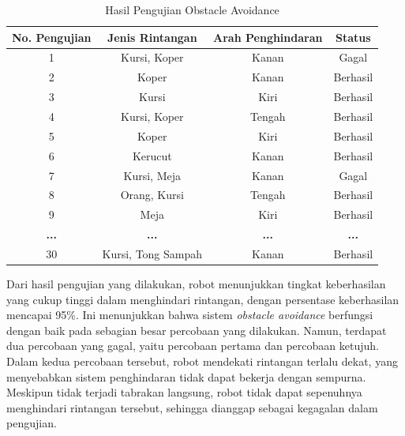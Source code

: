\begin{table}[H]
	\centering
	\caption{Hasil Pengujian Obstacle Avoidance}
	\begin{tabular}{|c|c|c|c|}
		\hline
		\textbf{No. Pengujian} & \textbf{Jenis Rintangan} & \textbf{Arah Penghindaran} & \textbf{Status} \\
		\hline
		1                      & Kursi, Koper             & Kanan                      & Gagal           \\
		\hline
		2                      & Koper                      & Kanan                      & Berhasil        \\
		\hline
		3                      & Kursi                    & Kiri                       & Berhasil        \\
		\hline
		4                      & Kursi, Koper             & Tengah                     & Berhasil        \\
		\hline
		5                      & Koper                      & Kiri                       & Berhasil        \\
		\hline
		6                      & Kerucut                  & Kanan                      & Berhasil        \\
		\hline
		7                      & Kursi, Meja              & Kanan                      & Gagal           \\
		\hline
		8                      & Orang, Kursi             & Tengah                     & Berhasil        \\
		\hline
		9                      & Meja                     & Kiri                       & Berhasil        \\
		\hline
		\textbf{...}           & \textbf{...}             & \textbf{...}               & \textbf{...}    \\
		\hline
		30                     & Kursi, Tong Sampah       & Kanan                      & Berhasil        \\
		\hline
	\end{tabular}
	\label{tab:hasil_obstacle_avoidance}
\end{table}

Dari hasil pengujian yang dilakukan, robot menunjukkan tingkat keberhasilan yang
cukup tinggi dalam menghindari rintangan, dengan persentase keberhasilan mencapai
95\%. Ini menunjukkan bahwa sistem \emph{obstacle avoidance} berfungsi dengan
baik pada sebagian besar percobaan yang dilakukan. Namun, terdapat dua percobaan
yang gagal, yaitu percobaan pertama dan percobaan ketujuh. Dalam kedua percobaan
tersebut, robot mendekati rintangan terlalu dekat, yang menyebabkan sistem
penghindaran tidak dapat bekerja dengan sempurna. Meskipun tidak terjadi tabrakan
langsung, robot tidak dapat sepenuhnya menghindari rintangan tersebut, sehingga dianggap
sebagai kegagalan dalam pengujian.


